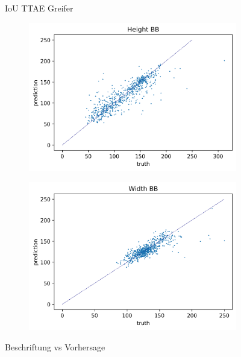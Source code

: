 \begin{figure}[h]
\begin{subfigure}[c]{0.32\textwidth}
 		\end{subfigure}
 		\caption{IoU TTAE Greifer}
 		\label{img:TTGrappleIoU}
 	\end{figure}
 
 	 	\begin{figure}[h]
 		\centering
 		\begin{subfigure}[c]{0.49\textwidth}			
 			\includegraphics[width=1\textwidth]{bilder/FazitUndAusblick/Grapple_TTAE_Res/Height_BB.png}
 		\end{subfigure}
 		\begin{subfigure}[c]{0.49\textwidth}			
 			\includegraphics[width=1\textwidth]{bilder/FazitUndAusblick/Grapple_TTAE_Res/Width_BB.png}
 		\end{subfigure}  
 		\caption{Beschriftung vs Vorhersage}
 		\label{img:TTGrappleLabelVsPred}
 	\end{figure}
 
